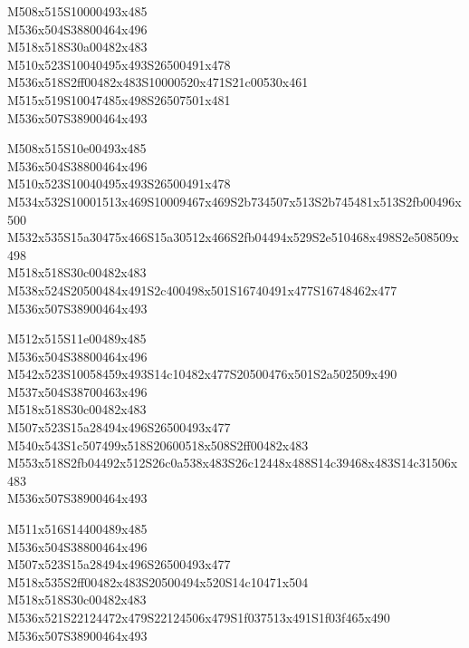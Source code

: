 \documentclass{article}
\begin{document}
\begin{multicols}{5}
\begin{center}

M508x515S10000493x485 %
\\M536x504S38800464x496 %
\\M518x518S30a00482x483 %
\\M510x523S10040495x493S26500491x478 %
\\M536x518S2ff00482x483S10000520x471S21c00530x461 %
\\M515x519S10047485x498S26507501x481 %
\\M536x507S38900464x493 %
\vfil
\columnbreak

M508x515S10e00493x485 %
\\M536x504S38800464x496 %
\\M510x523S10040495x493S26500491x478 %
\\M534x532S10001513x469S10009467x469S2b734507x513S2b745481x513S2fb00496x500 %
\\M532x535S15a30475x466S15a30512x466S2fb04494x529S2e510468x498S2e508509x498 %
\\M518x518S30c00482x483 %
\\M538x524S20500484x491S2c400498x501S16740491x477S16748462x477 %
\\M536x507S38900464x493 %
\vfil
\columnbreak

M512x515S11e00489x485 %
\\M536x504S38800464x496 %
\\M542x523S10058459x493S14c10482x477S20500476x501S2a502509x490 %
\\M537x504S38700463x496 %
\\M518x518S30c00482x483 %
\\M507x523S15a28494x496S26500493x477 %
\\M540x543S1c507499x518S20600518x508S2ff00482x483 %
\\M553x518S2fb04492x512S26c0a538x483S26c12448x488S14c39468x483S14c31506x483 %
\\M536x507S38900464x493 %
\vfil
\columnbreak

M511x516S14400489x485 %
\\M536x504S38800464x496 %
\\M507x523S15a28494x496S26500493x477 %
\\M518x535S2ff00482x483S20500494x520S14c10471x504 %
\\M518x518S30c00482x483 %
\\M536x521S22124472x479S22124506x479S1f037513x491S1f03f465x490 %
\\M536x507S38900464x493 %
\vfil
\columnbreak


\end{center}
\end{multicols}
\end{document}
